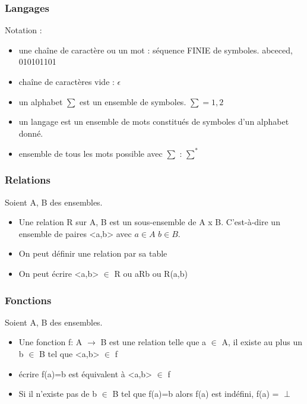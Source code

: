 \subsubsection{Langages}
\label{ssub:Langages}
Notation : 
\begin{itemize}
	\item une chaîne de caractère ou un mot : séquence FINIE de symboles. 
		abceced, 010101101
	\item chaîne de caractères vide : $\epsilon$
	\item un alphabet $\sum$ est un ensemble de symboles. $\sum = {1, 2}$
	\item un langage est un ensemble de mots constitués de symboles d'un alphabet
		donné.
	\item ensemble de tous les mots possible avec $\sum$ : $\sum ^*$
\end{itemize}


\subsubsection{Relations}
\label{ssub:relations}
Soient A, B des ensembles.
\begin{itemize}
	\item Une relation R sur A, B est un sous-ensemble de A x B. C'est-à-dire
		un ensemble de paires <a,b> avec $a\in A$ $b\in B$.
	\item On peut définir une relation par sa table
	\item On peut écrire <a,b> $\in$ R ou aRb ou R(a,b) 
\end{itemize}


\subsubsection{Fonctions}
\label{ssub:fonctions}
Soient A, B des ensembles.
\begin{itemize}
	\item Une fonction f: A $\rightarrow$ B est une relation telle que a $\in$
	A, il existe au plus un b $\in$ B tel que <a,b> $\in$ f
	\item écrire f(a)=b est équivalent à <a,b> $\in$ f
	\item Si il n'existe pas de b $\in$ B tel que f(a)=b alors f(a) est indéfini,
		f(a) = $\perp$
\end{itemize}

